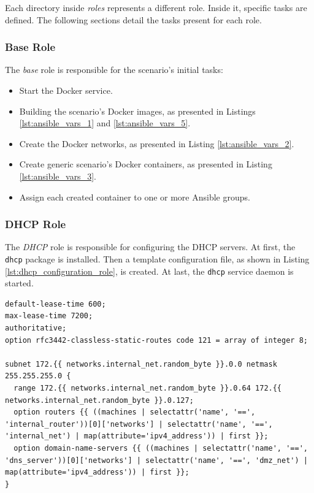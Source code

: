 Each directory inside \textit{roles} represents a different role. Inside it, specific tasks are defined. The following sections detail the tasks present for each role. 

\subsubsection{Base Role} \label{sec:ansible_base_role}

The \textit{base} role is responsible for the scenario's initial tasks:

\begin{itemize}
    \item Start the Docker service.
    \item Building the scenario's Docker images, as presented in Listings \ref{lst:ansible_vars_1} and \ref{lst:ansible_vars_5}.
    \item Create the Docker networks, as presented in Listing \ref{lst:ansible_vars_2}.
    \item Create generic scenario's Docker containers, as presented in Listing \ref{lst:ansible_vars_3}.
    \item Assign each created container to one or more Ansible groups.
\end{itemize}

\subsubsection{DHCP Role} \label{sec:ansible_dhcp_role}

The \textit{DHCP} role is responsible for configuring the DHCP servers. At first, the \texttt{dhcp} package is installed. Then a template configuration file, as shown in Listing \ref{lst:dhcp_configuration_role}, is created. At last, the \texttt{dhcp} service daemon is started.

\begin{lstlisting}[caption=DHCP Server Template Configuration.,numbers=none,label={lst:dhcp_configuration_role}]
default-lease-time 600;
max-lease-time 7200;
authoritative;
option rfc3442-classless-static-routes code 121 = array of integer 8;

subnet 172.{{ networks.internal_net.random_byte }}.0.0 netmask 255.255.255.0 {
  range 172.{{ networks.internal_net.random_byte }}.0.64 172.{{ networks.internal_net.random_byte }}.0.127;
  option routers {{ ((machines | selectattr('name', '==', 'internal_router'))[0]['networks'] | selectattr('name', '==', 'internal_net') | map(attribute='ipv4_address')) | first }};
  option domain-name-servers {{ ((machines | selectattr('name', '==', 'dns_server'))[0]['networks'] | selectattr('name', '==', 'dmz_net') | map(attribute='ipv4_address')) | first }};
}
\end{lstlisting}

